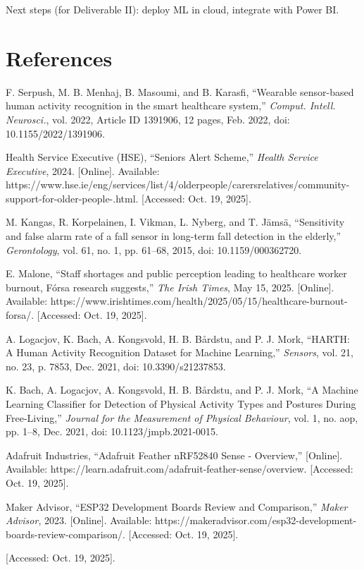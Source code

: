 \documentclass[conference]{lib/IEEEtran}
\begin{document}
Next steps (for Deliverable II): deploy ML in cloud, integrate with Power BI.


\section*{References}


\begin{thebibliography}{00}
 F. Serpush, M. B. Menhaj, B. Masoumi, and B. Karasfi, 
``Wearable sensor-based human activity recognition in the smart healthcare system,'' 
\textit{Comput. Intell. Neurosci.}, vol. 2022, Article ID 1391906, 12 pages, Feb. 2022, doi: 10.1155/2022/1391906.

 Health Service Executive (HSE), ``Seniors Alert Scheme,'' \textit{Health Service Executive}, 2024. [Online]. Available: https://www.hse.ie/eng/services/list/4/olderpeople/carersrelatives/community-support-for-older-people-.html. [Accessed: Oct. 19, 2025].

 M. Kangas, R. Korpelainen, I. Vikman, L. Nyberg, and T. Jämsä, 
``Sensitivity and false alarm rate of a fall sensor in long-term fall detection in the elderly,'' 
\textit{Gerontology}, vol. 61, no. 1, pp. 61--68, 2015, doi: 10.1159/000362720.

 E. Malone, ``Staff shortages and public perception leading to healthcare worker burnout, Fórsa research suggests,'' 
\textit{The Irish Times}, May 15, 2025. [Online]. Available: https://www.irishtimes.com/health/2025/05/15/healthcare-burnout-forsa/. [Accessed: Oct. 19, 2025].

 A. Logacjov, K. Bach, A. Kongsvold, H. B. Bårdstu, and P. J. Mork, 
``HARTH: A Human Activity Recognition Dataset for Machine Learning,'' 
\textit{Sensors}, vol. 21, no. 23, p. 7853, Dec. 2021, doi: 10.3390/s21237853.

 K. Bach, A. Logacjov, A. Kongsvold, H. B. Bårdstu, and P. J. Mork, 
``A Machine Learning Classifier for Detection of Physical Activity Types and Postures During Free-Living,'' 
\textit{Journal for the Measurement of Physical Behaviour}, vol. 1, no. aop, pp. 1--8, Dec. 2021, doi: 10.1123/jmpb.2021-0015.

 Adafruit Industries, ``Adafruit Feather nRF52840 Sense - Overview,'' [Online]. Available: https://learn.adafruit.com/adafruit-feather-sense/overview. [Accessed: Oct. 19, 2025].

 Maker Advisor, ``ESP32 Development Boards Review and Comparison,'' 
\textit{Maker Advisor}, 2023. [Online]. Available: https://makeradvisor.com/esp32-development-boards-review-comparison/. 
[Accessed: Oct. 19, 2025].

[Accessed: Oct. 19, 2025].

\end{thebibliography}
\end{document}
